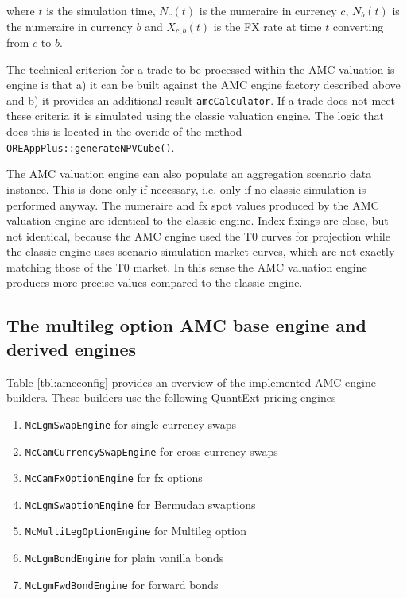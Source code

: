 \documentclass[12pt, a4paper]{article}
\begin{document}
where $t$ is the simulation time, $N_c(t)$ is the numeraire in currency $c$, $N_b(t)$ is the numeraire in currency
$b$ and $X_{c,b}(t)$ is the FX rate at time $t$ converting from $c$ to $b$.

The technical criterion for a trade to be processed within the AMC valuation is engine is that a) it can be built
against the AMC engine factory described above and b) it provides an additional result \verb+amcCalculator+. If a trade
does not meet these criteria it is simulated using the classic valuation engine. The logic that does this is located in
the overide of the method \verb+OREAppPlus::generateNPVCube()+.

The AMC valuation engine can also populate an aggregation scenario data instance. This is done only if necessary,
i.e. only if no classic simulation is performed anyway. The numeraire and fx spot values produced by the AMC valuation
engine are identical to the classic engine. Index fixings are close, but not identical, because the AMC engine used the
T0 curves for projection while the classic engine uses scenario simulation market curves, which are not exactly matching
those of the T0 market. In this sense the AMC valuation engine produces more precise values compared to the classic
engine.

\subsection{The multileg option AMC base engine and derived engines}\label{sec:amc_base_engine}

Table \ref{tbl:amcconfig} provides an overview of the implemented AMC engine builders. These builders use the following
QuantExt pricing engines

\begin{enumerate}
\item \verb+McLgmSwapEngine+ for single currency swaps
\item \verb+McCamCurrencySwapEngine+ for cross currency swaps
\item \verb+McCamFxOptionEngine+ for fx options
\item \verb+McLgmSwaptionEngine+ for Bermudan swaptions
\item \verb+McMultiLegOptionEngine+ for Multileg option
\item \verb+McLgmBondEngine+ for plain vanilla bonds
\item \verb+McLgmFwdBondEngine+ for forward bonds
\end{enumerate}
\end{document}
